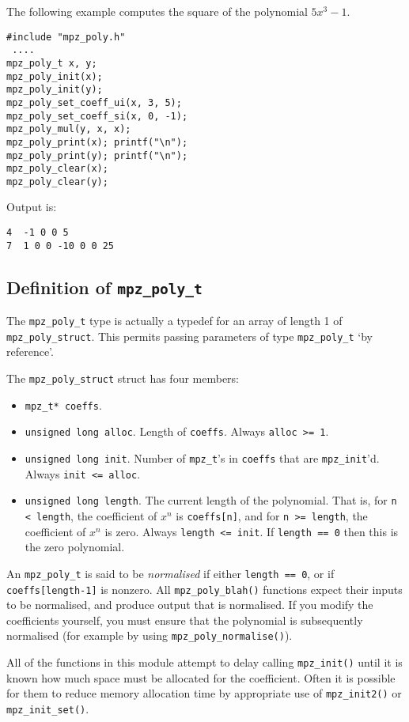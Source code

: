 \documentclass[a4paper,10pt]{article}
\newcommand{\code}{\lstinline}
\begin{document}
The following example computes the square of the polynomial $5x^3 - 1$.

\begin{lstlisting}
#include "mpz_poly.h"
 ....
mpz_poly_t x, y;
mpz_poly_init(x);
mpz_poly_init(y);
mpz_poly_set_coeff_ui(x, 3, 5);
mpz_poly_set_coeff_si(x, 0, -1);
mpz_poly_mul(y, x, x);
mpz_poly_print(x); printf("\n");
mpz_poly_print(y); printf("\n");
mpz_poly_clear(x);
mpz_poly_clear(y);
\end{lstlisting}

Output is:

\begin{lstlisting}
4  -1 0 0 5
7  1 0 0 -10 0 0 25
\end{lstlisting}

\subsection{Definition of \code{mpz_poly_t}}

The \code{mpz_poly_t} type is actually a typedef for an array of length 1 of \code{mpz_poly_struct}. This permits passing parameters  of type \code{mpz_poly_t} `by reference'.

The \code{mpz_poly_struct} struct has four members:
\begin{itemize}
\item \code{mpz_t* coeffs}.
\item \code{unsigned long alloc}. Length of \code{coeffs}. Always \code{alloc >= 1}.
\item \code{unsigned long init}. Number of \code{mpz_t}'s in \code{coeffs} that are \code{mpz_init}'d. Always \code{init <= alloc}.
\item \code{unsigned long length}. The current length of the polynomial. That is, for \code{n < length}, the coefficient of $x^n$ is \code{coeffs[n]}, and for \code{n >= length}, the coefficient of $x^n$ is zero. Always \code{length <= init}. If \code{length == 0} then this is the zero polynomial. 
\end{itemize}

An \code{mpz_poly_t} is said to be \emph{normalised} if either \code{length == 0}, or if \code{coeffs[length-1]} is nonzero. All \code{mpz_poly_blah()} functions expect their inputs to be normalised, and produce output that is normalised. If you modify the coefficients yourself, you must ensure that the polynomial is subsequently normalised (for example by using \code{mpz_poly_normalise()}).

All of the functions in this module attempt to delay calling \code{mpz_init()} until it is known how much space must be allocated for the coefficient. Often it is possible for them to reduce memory allocation time by appropriate use of \code{mpz_init2()} or \code{mpz_init_set()}.
\end{document}
